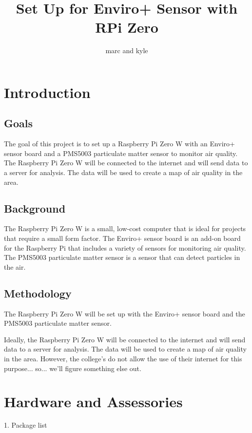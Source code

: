 \documentclass{article}
\author{marc and kyle}
\title{Set Up for Enviro+ Sensor with RPi Zero}
\begin{document}
\maketitle

\section{Introduction}

\subsection{Goals}

The goal of this project is to set up a Raspberry Pi Zero W with an Enviro+ sensor board and a PMS5003 particulate matter sensor to monitor air quality. The Raspberry Pi Zero W will be connected to the internet and will send data to a server for analysis. The data will be used to create a map of air quality in the area.

\subsection{Background}

The Raspberry Pi Zero W is a small, low-cost computer that is ideal for projects that require a small form factor. The Enviro+ sensor board is an add-on board for the Raspberry Pi that includes a variety of sensors for monitoring air quality. The PMS5003 particulate matter sensor is a sensor that can detect particles in the air.

\subsection{Methodology}

The Raspberry Pi Zero W will be set up with the Enviro+ sensor board and the PMS5003 particulate matter sensor. 

Ideally, the Raspberry Pi Zero W will be connected to the internet and will send data to a server for analysis. The data will be used to create a map of air quality in the area. However, the college's do not allow the use of their internet for this purpose... so... we'll figure something else out.

\section{Hardware and Assessories}

1. Package list
\end{document}
